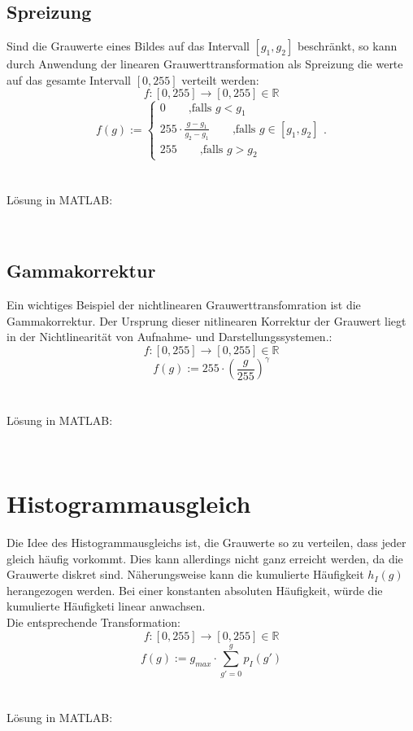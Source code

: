 \subsection{Spreizung}
Sind die Grauwerte eines Bildes auf das Intervall $[g_1,g_2]$ beschränkt, so kann durch Anwendung der linearen Grauwerttransformation als Spreizung die werte auf das gesamte Intervall $[0,255]$ verteilt werden:
\[
	f:[0,255] \rightarrow[0,255] \in \mathbb{R}
\]
\[
	f(g) := \left\lbrace \begin{matrix}
		0 \qquad \text{,falls } g < g_1\\
		255 \cdot \frac{g - g_1}{g_2 - g_1} \qquad \text{,falls } g \in [g_1,g_2]\\
		255 \qquad \text{,falls } g > g_2
	\end{matrix}.\right.
\]\\\\
Lösung in MATLAB:
\lstset{language=Matlab}

~\\

\subsection{Gammakorrektur}
Ein wichtiges Beispiel der nichtlinearen Grauwerttransfomration ist die Gammakorrektur. Der Ursprung dieser nitlinearen Korrektur der Grauwert liegt in der Nichtlinearität von Aufnahme- und Darstellungssystemen.:
\[
	f:[0,255] \rightarrow[0,255] \in \mathbb{R}
\]
\[
	f(g) := 255 \cdot \left(\frac{g}{255}\right)^\gamma
\]\\\\
Lösung in MATLAB:
\lstset{language=Matlab}

~\\

\section{Histogrammausgleich}
Die Idee des Histogrammausgleichs ist, die Grauwerte so zu verteilen, dass jeder gleich häufig vorkommt. Dies kann allerdings nicht ganz erreicht werden, da die Grauwerte diskret sind. Näherungsweise kann die kumulierte Häufigkeit $h_I(g)$ herangezogen werden. Bei einer konstanten absoluten Häufigkeit, würde die kumulierte Häufigketi linear anwachsen.\\
Die entsprechende Transformation:
\[
	f:[0,255] \rightarrow[0,255] \in \mathbb{R}
\]
\[
	f(g) := g_{max} \cdot \sum_{g'=0}^{g}p_I(g')
\]\\\\
Lösung in MATLAB:
\lstset{language=Matlab}

~\\

